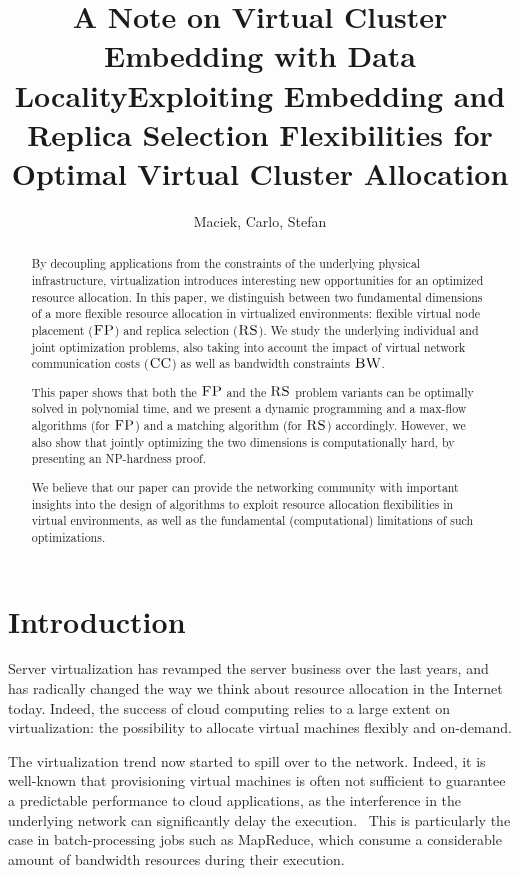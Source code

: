\documentclass[11pt,a4paper]{scrartcl}
\title{A Note on Virtual Cluster Embedding with Data Locality}
\title{Exploiting Embedding and Replica Selection Flexibilities for Optimal Virtual Cluster Allocation}
\author{Maciek, Carlo, Stefan}
\newcommand{\CC}{\textsc{CC}}
\newcommand{\FP}{\textsc{FP}}
\newcommand{\RS}{\textsc{RS}}
\newcommand{\BW}{\textsc{BW}}
\begin{document}
\maketitle


\begin{abstract}
By decoupling applications from the constraints of the underlying physical
infrastructure, virtualization introduces interesting new opportunities 
for an optimized resource allocation. In this paper, we distinguish between two
fundamental dimensions of a more flexible resource allocation in virtualized
environments: flexible virtual node placement ($\FP$) and replica selection ($\RS$). 
We study the underlying individual and joint optimization problems, 
also taking into account the impact of virtual network communication costs ($\CC$) as well as 
bandwidth constraints $\BW$.

This paper shows that both the $\FP$ and the $\RS$ problem variants can be optimally solved in polynomial time,
and we present a dynamic programming and a max-flow algorithms (for $\FP$) and a matching algorithm (for $\RS$) accordingly. 
However, we also show that jointly optimizing the two dimensions is computationally hard, by presenting an NP-hardness proof. 

We believe that our paper can provide the networking community with important insights into the 
design of algorithms to exploit resource allocation flexibilities in virtual environments, as well as the fundamental (computational)
limitations of such optimizations.
\end{abstract}

\section{Introduction}

Server virtualization has revamped the server business over the last years,
and has radically changed the way we think about resource allocation in the Internet today.
Indeed, the success of cloud computing relies to a large extent on virtualization:
the possibility to allocate virtual machines flexibly and on-demand.

The virtualization trend now started to spill over to the network. Indeed, it is well-known
that provisioning virtual machines is often not sufficient to guarantee a predictable performance
to cloud applications, as the interference in the underlying network can significantly delay the
execution.~\cite{talk-about} This is particularly the case in batch-processing jobs such as MapReduce, which consume
a considerable amount of bandwidth resources during their execution.~\cite{amazonbw}
\end{document}
